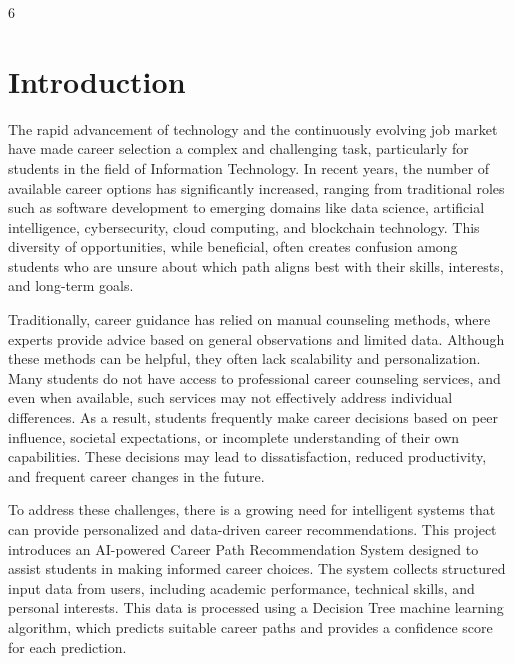 \documentclass[12pt,a4paper]{report}
\begin{document}
\vfill
\begin{center}
    6
\end{center}


\clearpage
\chapter{Introduction}

\setlength{\parindent}{15pt}
\setlength{\parskip}{0.5em}
{\justifying


The rapid advancement of technology and the continuously evolving job market have made career selection a complex and challenging task, particularly for students in the field of Information Technology. In recent years, the number of available career options has significantly increased, ranging from traditional roles such as software development to emerging domains like data science, artificial intelligence, cybersecurity, cloud computing, and blockchain technology. This diversity of opportunities, while beneficial, often creates confusion among students who are unsure about which path aligns best with their skills, interests, and 
long-term goals.

Traditionally, career guidance has relied on manual counseling methods, where experts provide advice based on general observations and limited data. Although these methods can be helpful, they often lack scalability and personalization. Many students do not have access to professional career counseling services, and even when available, such services may not effectively address individual differences. As a result, students frequently make career decisions based on peer influence, societal expectations, or incomplete understanding of their own capabilities. These decisions may lead to dissatisfaction, reduced productivity, and frequent career changes 
in the future.

To address these challenges, there is a growing need for intelligent systems that can provide personalized and data-driven career recommendations. This project introduces an AI-powered Career Path Recommendation System designed to assist students in making informed career choices. The system collects structured input data from users, including academic performance, technical skills, and personal interests. This data is processed using a Decision Tree machine learning algorithm, which predicts suitable career paths and provides a confidence score for each prediction.

}
\end{document}
